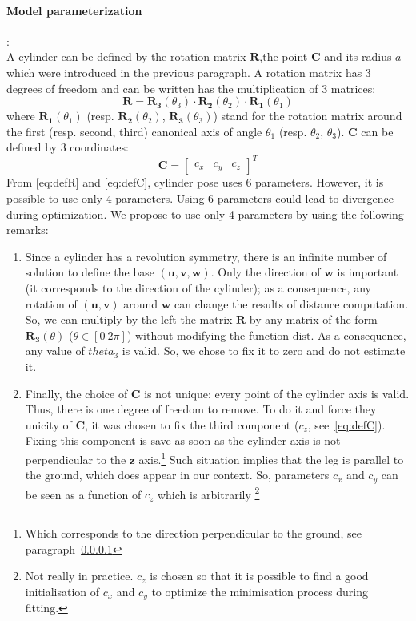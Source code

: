 \documentclass[letterpaper, 10 pt, conference]{ieeeconf}
\begin{document}
\paragraph{Model parameterization}:~\\
A cylinder can be defined by the rotation matrix $\mathbf{R}$,the point $\mathbf{C}$ and its radius $a$ which were introduced in the previous paragraph. A rotation matrix has 3 degrees of freedom and can be written has the multiplication of 3 matrices:
\begin{equation}
	\mathbf{R} = \mathbf{R_3}(\theta_3)\cdot\mathbf{R_2}(\theta_2)\cdot\mathbf{R_1}(\theta_1)
	\label{eq:defR}
\end{equation}
where $\mathbf{R_1}(\theta_1)$ (resp. $\mathbf{R_2}(\theta_2)$, $\mathbf{R_3}(\theta_3)$) stand for the rotation matrix around the first (resp. second, third) canonical axis of angle $\theta_1$ (resp. $\theta_2$, $\theta_3$). $\mathbf{C}$ can be defined by 3 coordinates:
\begin{equation}
	\mathbf{C} = \begin{bmatrix}
			c_x & c_y & c_z
		\end{bmatrix}^T
	\label{eq:defC}
\end{equation}
From \eqref{eq:defR} and \eqref{eq:defC}, cylinder pose uses 6 parameters. However, it is possible to use only 4 parameters. Using 6 parameters could lead to divergence during optimization. We propose to use only 4 parameters by using the following remarks: 
\begin{enumerate}
	\item Since a cylinder has a revolution symmetry, there is an infinite number of solution to define the base $(\mathbf{u},\mathbf{v},\mathbf{w})$. Only the direction of $\mathbf{w}$ is important (it corresponds to the direction of the cylinder); as a consequence, any rotation of $(\mathbf{u},\mathbf{v})$ around $\mathbf{w}$ can change the results of distance computation. So, we can multiply by the left the matrix $\mathbf{R}$ by any matrix of the form $\mathbf{R_3}(\theta)$ ($\theta\in[0\ 2\pi]$) without modifying the function $\mathrm{dist}$. As a consequence, any value of $theta_3$ is valid. So, we chose to fix it to zero and do not estimate it.
	\item Finally, the choice of $\mathbf{C}$ is not unique: every point of the cylinder axis is valid. Thus, there is one degree of freedom to remove. To do it and force they unicity of $\mathbf{C}$, it was chosen to fix the third component ($c_z$, see~\eqref{eq:defC}). Fixing this component is save as soon as the cylinder axis is not perpendicular to the $\mathbf{z}$ axis.\footnote{Which corresponds to the direction perpendicular to the ground, see paragraph~\ref{}} Such situation implies that the leg is parallel to the ground, which does appear in our context. So, parameters $c_x$ and $c_y$ can be seen as a function of $c_z$ which is arbitrarily \footnote{Not really in practice. $c_z$ is chosen so that it is possible to find a good initialisation of $c_x$ and $c_y$ to optimize the minimisation process during fitting.}
\end{enumerate}
\end{document}

